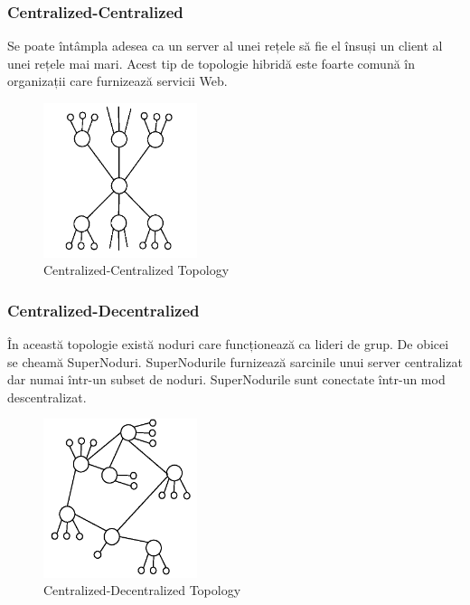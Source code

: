 \subsubsection{Centralized-Centralized}

Se poate întâmpla adesea ca un server al unei rețele să fie el însuși un
client al unei rețele mai mari. Acest tip de topologie hibridă este foarte
comună în organizații care furnizează servicii Web.

\begin{figure}
  \centering
  \includegraphics[width=0.4\textwidth]{src/img/p2p-systems/centralized-centralized}
  \caption{Centralized-Centralized Topology}
  \label{fig:p2p-systems:centralized-centralized}
\end{figure}

\subsubsection{Centralized-Decentralized}

În această topologie există noduri care funcționează ca lideri de grup. De
obicei se cheamă SuperNoduri. SuperNodurile furnizează sarcinile unui server
centralizat dar numai într-un subset de noduri. SuperNodurile sunt conectate
într-un mod descentralizat.

\begin{figure}
  \centering
  \includegraphics[width=0.4\textwidth]{src/img/p2p-systems/centralized-decentralized}
  \caption{Centralized-Decentralized Topology}
  \label{fig:p2p-systems:centralized-decentralized}
\end{figure}

